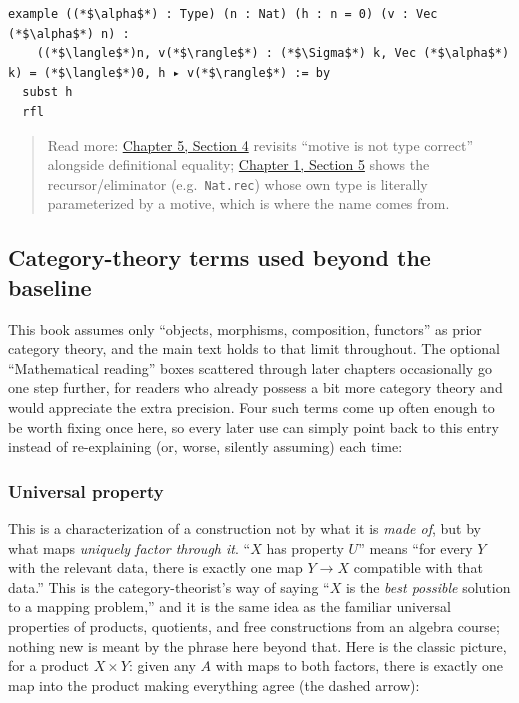 \begin{lstlisting}
example ((*$\alpha$*) : Type) (n : Nat) (h : n = 0) (v : Vec (*$\alpha$*) n) :
    ((*$\langle$*)n, v(*$\rangle$*) : (*$\Sigma$*) k, Vec (*$\alpha$*) k) = (*$\langle$*)0, h ▸ v(*$\rangle$*) := by
  subst h
  rfl
\end{lstlisting}

\begin{quote}
Read more: \hyperref[sec:05-rigor-check:04-defeq-vs-propeq:1]{Chapter 5, Section 4} revisits ``motive is not type correct'' alongside definitional equality; \hyperref[sec:01-basics:05-pi-sigma-and-coc:1]{Chapter 1, Section 5} shows the recursor/eliminator (e.g.~\texttt{Nat.rec}) whose own type is literally parameterized by a motive, which is where the name comes from.
\end{quote}

\subsection{Category-theory terms used beyond the baseline}\label{sec:01-basics:04-terminology:7}

This book assumes only ``objects, morphisms, composition, functors'' as prior category theory, and the main text holds to that limit throughout. The optional ``Mathematical reading'' boxes scattered through later chapters occasionally go one step further, for readers who already possess a bit more category theory and would appreciate the extra precision. Four such terms come up often enough to be worth fixing once here, so every later use can simply point back to this entry instead of re-explaining (or, worse, silently assuming) each time:

\subsubsection{Universal property}\label{sec:01-basics:04-terminology:8}

This is a characterization of a construction not by what it is \emph{made of}, but by what maps \emph{uniquely factor through it}. ``\(X\) has property \(U\)'' means ``for every \(Y\) with the relevant data, there is exactly one map \(Y \to X\) compatible with that data.'' This is the category-theorist's way of saying ``\(X\) is the \emph{best possible} solution to a mapping problem,'' and it is the same idea as the familiar universal properties of products, quotients, and free constructions from an algebra course; nothing new is meant by the phrase here beyond that. Here is the classic picture, for a product \(X \times Y\): given any \(A\) with maps to both factors, there is exactly one map into the product making everything agree (the dashed arrow):

